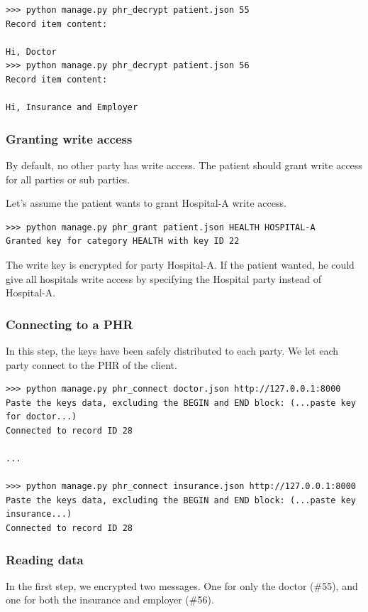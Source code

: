 \documentclass[a4paper]{article}
\begin{document}
			\begin{lstlisting}
>>> python manage.py phr_decrypt patient.json 55
Record item content:

Hi, Doctor
>>> python manage.py phr_decrypt patient.json 56
Record item content:

Hi, Insurance and Employer
			\end{lstlisting}
		
		\subsubsection{Granting write access}\label{sec:usecase_3}
			By default, no other party has write access. The patient should grant write access for all parties or sub parties.
		
			Let's assume the patient wants to grant Hospital-A write access.
			
			\begin{lstlisting}		
>>> python manage.py phr_grant patient.json HEALTH HOSPITAL-A
Granted key for category HEALTH with key ID 22
			\end{lstlisting}
			
			The write key is encrypted for party Hospital-A. If the patient wanted, he could give all hospitals write access by specifying the Hospital party instead of Hospital-A.
		
		\subsubsection{Connecting to a PHR}\label{sec:usecase_4}
			In this step, the keys have been safely distributed to each party. We let each party connect to the PHR of the client.
		
			\begin{lstlisting}
>>> python manage.py phr_connect doctor.json http://127.0.0.1:8000
Paste the keys data, excluding the BEGIN and END block: (...paste key for doctor...)
Connected to record ID 28

...

>>> python manage.py phr_connect insurance.json http://127.0.0.1:8000
Paste the keys data, excluding the BEGIN and END block: (...paste key insurance...)
Connected to record ID 28
			\end{lstlisting}
			
		\subsubsection{Reading data}\label{sec:usecase_5}
			In the first step, we encrypted two messages. One for only the doctor (\#55), and one for both the insurance and employer (\#56). 
			
\end{document}
